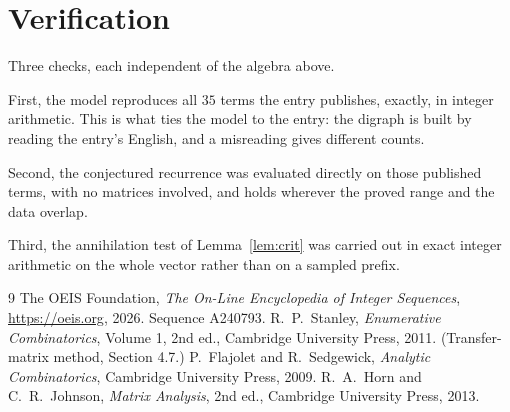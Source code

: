 \documentclass[11pt,a4paper]{article}
\theoremstyle{plain}
\theoremstyle{definition}
\begin{document}
\section{Verification}

Three checks, each independent of the algebra above.

First, the model reproduces all $35$ terms the entry publishes, exactly, in integer
arithmetic. This is what ties the model to the entry: the digraph is built by reading the
entry's English, and a misreading gives different counts.

Second, the conjectured recurrence was evaluated directly on those published terms, with no
matrices involved, and holds wherever the proved range and the data overlap.

Third, the annihilation test of Lemma~\ref{lem:crit} was carried out in exact integer
arithmetic on the whole vector rather than on a sampled prefix.

\begin{thebibliography}{9}
 The OEIS Foundation, \emph{The On-Line Encyclopedia of Integer
Sequences}, \url{https://oeis.org}, 2026. Sequence A240793.
 R.~P.~Stanley, \emph{Enumerative Combinatorics}, Volume 1, 2nd ed.,
Cambridge University Press, 2011. (Transfer-matrix method, Section 4.7.)
 P.~Flajolet and R.~Sedgewick, \emph{Analytic Combinatorics}, Cambridge
University Press, 2009.
 R.~A.~Horn and C.~R.~Johnson, \emph{Matrix Analysis}, 2nd ed., Cambridge
University Press, 2013.
\end{thebibliography}
\end{document}
